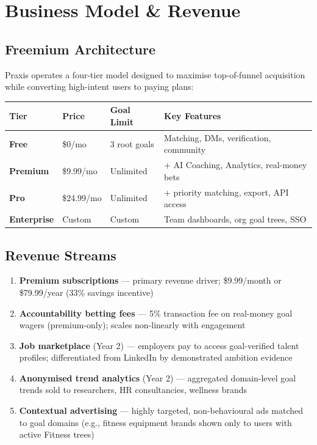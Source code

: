 \documentclass[11pt,a4paper]{article}
\begin{document}
\section{Business Model \& Revenue}

\subsection{Freemium Architecture}

Praxis operates a four-tier model designed to maximise top-of-funnel acquisition while converting high-intent users to paying plans:

\begin{center}
\begin{tabular}{llll}
\toprule
\textbf{Tier} & \textbf{Price} & \textbf{Goal Limit} & \textbf{Key Features} \\
\midrule
\textbf{Free} & \$0/mo & 3 root goals & Matching, DMs, verification, community \\
\textbf{Premium} & \$9.99/mo & Unlimited & + AI Coaching, Analytics, real-money bets \\
\textbf{Pro} & \$24.99/mo & Unlimited & + priority matching, export, API access \\
\textbf{Enterprise} & Custom & Custom & Team dashboards, org goal trees, SSO \\
\bottomrule
\end{tabular}
\end{center}

\subsection{Revenue Streams}

\begin{enumerate}
  \item \textbf{Premium subscriptions} — primary revenue driver; \$9.99/month or \$79.99/year (33\% savings incentive)
  \item \textbf{Accountability betting fees} — 5\% transaction fee on real-money goal wagers (premium-only); scales non-linearly with engagement
  \item \textbf{Job marketplace} (Year 2) — employers pay to access goal-verified talent profiles; differentiated from LinkedIn by demonstrated ambition evidence
  \item \textbf{Anonymised trend analytics} (Year 2) — aggregated domain-level goal trends sold to researchers, HR consultancies, wellness brands
  \item \textbf{Contextual advertising} — highly targeted, non-behavioural ads matched to goal domains (e.g., fitness equipment brands shown only to users with active Fitness trees)
\end{enumerate}
\end{document}
